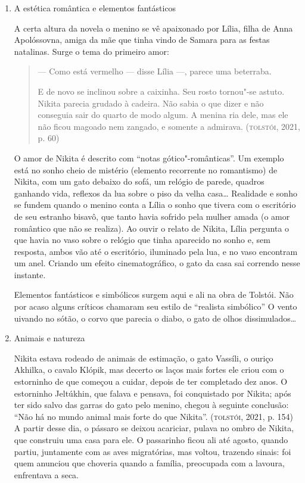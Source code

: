 \documentclass[11pt]{extarticle}
\begin{document}
\begin{enumerate}
\item
A estética romântica e elementos fantásticos

A certa altura da novela o menino se vê apaixonado por Lília, filha de
Anna Apolóssovna, amiga da mãe que tinha vindo de Samara para as festas
natalinas. Surge o tema do primeiro amor:

\begin{quote}
--- Como está vermelho --- disse Lília ---, parece uma beterraba.

E de novo se inclinou sobre a caixinha. Seu rosto tornou"-se astuto.
Nikita parecia grudado à cadeira. Não sabia o que dizer e não conseguia
sair do quarto de modo algum. A menina ria dele, mas ele não ficou
magoado nem zangado, e somente a admirava. (\textsc{tolstói}, 2021, p. 60)
\end{quote}

O amor de Nikita é descrito com ``notas gótico"-românticas''. Um
exemplo está no sonho cheio de mistério (elemento recorrente no
romantismo) de Nikita, com um gato debaixo do sofá, um relógio de
parede, quadros ganhando vida, reflexos da lua sobre o piso da velha
casa\ldots{} Realidade e sonho se fundem quando o menino conta a Lília o
sonho que tivera com o escritório de seu estranho bisavô, que tanto
havia sofrido pela mulher amada (o amor romântico que não se realiza).
Ao ouvir o relato de Nikita, Lília pergunta o que havia no vaso sobre o
relógio que tinha aparecido no sonho e, sem resposta, ambos vão até o
escritório, iluminado pela lua, e no vaso encontram um anel. Criando um
efeito cinematográfico, o gato da casa sai correndo nesse instante.

Elementos fantásticos e simbólicos surgem aqui e ali na obra de
Tolstói. Não por acaso alguns críticos chamaram seu estilo de ``realista
simbólico'' O vento uivando no sótão, o corvo que parecia o diabo, o
gato de olhos dissimulados\ldots{}


\item
Animais e natureza

Nikita estava rodeado de animais de estimação, o gato Vassíli, o
ouriço Akhilka, o cavalo Klópik, mas decerto os laços mais fortes ele
criou com o estorninho de que começou a cuidar, depois de ter completado
dez anos. O estorninho Jeltúkhin, que falava e pensava, foi conquistado
por Nikita; após ter sido salvo das garras do gato pelo menino, chegou à
seguinte conclusão: ``Não há no mundo animal mais forte do que Nikita''.
(\textsc{tolstói}, 2021, p. 154) A partir desse dia, o pássaro se deixou
acariciar, pulava no ombro de Nikita, que construiu uma casa para ele. O
passarinho ficou ali até agosto, quando partiu, juntamente com as aves
migratórias, mas voltou, trazendo sinais: foi quem anunciou que choveria
quando a família, preocupada com a lavoura, enfrentava a seca.


\end{enumerate}
\end{document}

